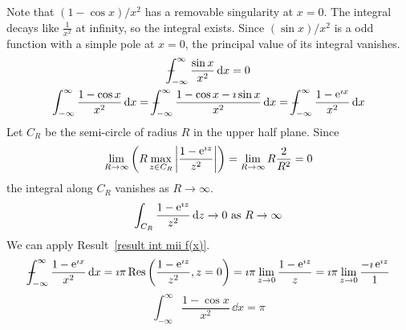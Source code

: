 {%
\begin{Solution}
  \label{solution (1-cos x)/x^2}
  Note that $(1 - \cos x)/x^2$ has a removable singularity at $x = 0$.
  The integral decays like $\frac{1}{x^2}$ at infinity, so the integral 
  exists.
  Since $(\sin x)/x^2$ is a odd function with a simple pole at $x = 0$,
  the principal value of its integral vanishes.
  \begin{gather*}
    \pv \int_{-\infty}^\infty \frac{\sin x}{x^2}\,\dd x = 0 \\
    \int_{-\infty}^\infty \frac{1 - \cos x}{x^2}\,\dd x 
    = \pv \int_{-\infty}^\infty \frac{1 - \cos x - \imath \sin x}{x^2}\,\dd x
    = \pv \int_{-\infty}^\infty \frac{1 - \e^{\imath x}}{x^2}\,\dd x
  \end{gather*}
  Let $C_R$ be the semi-circle of radius $R$ in the upper half plane.
  Since
  \[
  \lim_{R \to \infty} \left( R \max_{z \in C_R} \left| \frac{1 - \mathop{\mathrm{e}}\nolimits^{\imath z}}{z^2} \right| \right)
  = \lim_{R \to \infty} R \frac{2}{R^2} = 0
  \]
  the integral along $C_R$ vanishes as $R \to \infty$.  
  \[
  \int_{C_R} \frac{1 - \mathop{\mathrm{e}}\nolimits^{\imath z}}{z^2}\,\mathrm{d} z \to 0\ \mathrm{as}\ R \to \infty
  \]
  We can apply Result~\ref{result int mii f(x)}.
  \[
  - \negthickspace \negthickspace \negthickspace \negmedspace \int_{-\infty}^\infty \frac{1 - \mathop{\mathrm{e}}\nolimits^{\imath x}}{x^2}\,\mathrm{d} x
  = \imath \pi \mathop{\mathrm{Res}}\nolimits \left( \frac{1 - \mathop{\mathrm{e}}\nolimits^{\imath z}}{z^2}, z = 0 \right)
  = \imath \pi \lim_{z \to 0} \frac{1 - \mathop{\mathrm{e}}\nolimits^{\imath z}}{z}
  = \imath \pi \lim_{z \to 0} \frac{-\imath \mathop{\mathrm{e}}\nolimits^{\imath z}}{1}
  \]
  \[
  \boxed{
    \int_{-\infty}^\infty \frac{1 - \cos x}{x^2}\,\dd x = \pi
    }
  \]
\end{Solution}



}
